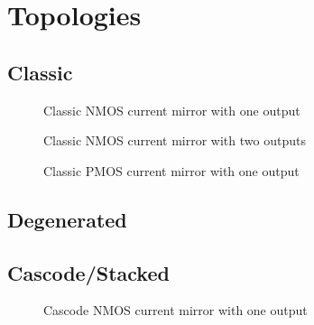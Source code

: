 \documentclass{article}[11pt]
\begin{document}
\section{Topologies}

\subsection{Classic}

\begin{figure}[H]
  \centering
  \begin{circuitikz}
    
  \end{circuitikz}
  \caption{Classic NMOS current mirror with one output}
  \label{fig:classic-nmos-1}
\end{figure}

\begin{figure}[H]
  \centering
  \begin{circuitikz}
    
  \end{circuitikz}
  \caption{Classic NMOS current mirror with two outputs}
  \label{fig:classic-nmos-2}
\end{figure}


\begin{figure}[H]
  \centering
  \begin{circuitikz}
    
  \end{circuitikz}
  \caption{Classic PMOS current mirror with one output}
  \label{fig:classic-pmos-1}
\end{figure}

\subsection{Degenerated}

\cite[section 3.5]{johnsmartin-aicd-12}

\subsection{Cascode/Stacked}

\cite[section 3.6]{johnsmartin-aicd-12}

\begin{figure}[H]
  \centering
  \begin{circuitikz}
    
  \end{circuitikz}
  \caption{Cascode NMOS current mirror with one output}
  \label{fig:casc-nmos-1}
\end{figure}
\end{document}
